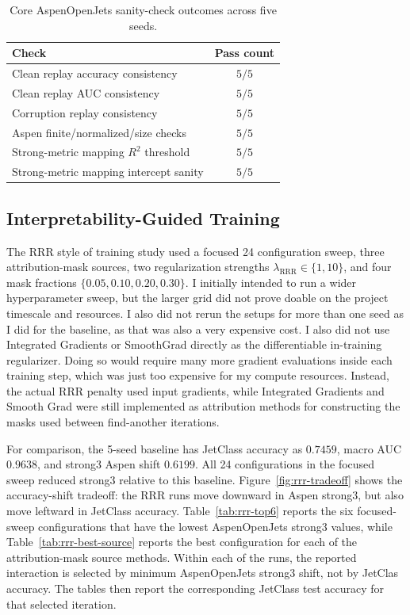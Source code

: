 \begin{table}[t]
\centering
\caption{Core AspenOpenJets sanity-check outcomes across five seeds.}
\label{tab:aspen-sanity}
\begin{tabular}{lc}
\toprule
Check & Pass count \\
\midrule
Clean replay accuracy consistency & $5/5$ \\
Clean replay AUC consistency & $5/5$ \\
Corruption replay consistency & $5/5$ \\
Aspen finite/normalized/size checks & $5/5$ \\
Strong-metric mapping $R^2$ threshold & $5/5$ \\
Strong-metric mapping intercept sanity & $5/5$ \\
\bottomrule
\end{tabular}
\end{table}

\subsection{Interpretability-Guided Training}

The RRR style of training study used a focused 24 configuration sweep, three attribution-mask sources, two regularization strengths  $\lambda_{\mathrm{RRR}}\in\{1,10\}$, and four mask fractions $\{0.05,0.10,0.20,0.30\}$. I initially intended to run a wider hyperparameter sweep, but the larger grid did not prove doable on the project timescale and resources. I also did not rerun the setups for more than one seed as I did for the baseline, as that was also a very expensive cost. I also did not use Integrated Gradients or SmoothGrad directly as the differentiable in-training regularizer. Doing so would require many more gradient evaluations inside each training step, which was just too expensive for my compute resources. Instead, the actual RRR penalty used input gradients, while Integrated Gradients and Smooth Grad were still implemented as attribution methods for constructing the masks used between find-another iterations.

For comparison, the 5-seed baseline has JetClass accuracy as  $0.7459$, macro AUC $0.9638$, and strong3 Aspen shift $0.6199$. All 24 configurations in the focused sweep reduced strong3 relative to this baseline. Figure~\ref{fig:rrr-tradeoff} shows the accuracy-shift tradeoff: the RRR runs move downward in Aspen strong3, but also move leftward in JetClass accuracy. Table~\ref{tab:rrr-top6} reports the six focused-sweep configurations that have the lowest AspenOpenJets strong3 values, while Table~\ref{tab:rrr-best-source} reports the best configuration for each of the attribution-mask source methods. Within each of the runs, the reported interaction is selected by minimum	AspenOpenJets strong3 shift, not by JetClas accuracy. The tables then report the corresponding JetClass test accuracy for that selected iteration.

